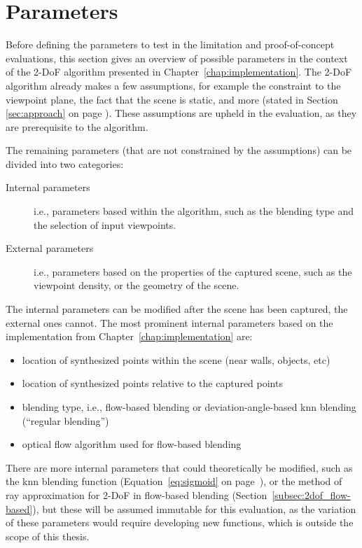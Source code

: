 \section{Parameters} \label{sec:params}
Before defining the parameters to test in the limitation and proof-of-concept evaluations, this section gives an overview of possible parameters in the context of the 2-DoF algorithm presented in Chapter~\ref{chap:implementation}.
The 2-DoF algorithm already makes a few assumptions, for example the constraint to the viewpoint plane, the fact that the scene is static, and more (stated in Section \ref{sec:approach} on page \pageref{sec:approach}). These assumptions are upheld in the evaluation, as they are prerequisite to the algorithm.

The remaining parameters (that are not constrained by the assumptions) can be divided into two categories: 
\begin{description}
    \item [Internal parameters] i.e., parameters based within the algorithm, such as the blending type and the selection of input viewpoints.
    \item [External parameters] i.e., parameters based on the properties of the captured scene, such as the viewpoint density, or the geometry of the scene.
\end{description}      

The internal parameters can be modified after the scene has been captured, the external ones cannot.  The most prominent internal parameters based on the implementation from Chapter~\ref{chap:implementation} are:

\begin{itemize}
  \item location of synthesized points within the scene (near walls, objects, etc)
  \item location of synthesized points relative to the captured points
  \item blending type, i.e., flow-based blending or deviation-angle-based knn blending (``regular blending'')
  \item optical flow algorithm used for flow-based blending
\end{itemize}

There are more internal parameters that could theoretically be modified, such as the knn blending function (Equation~\ref{eq:sigmoid} on page~\pageref{eq:sigmoid}), or the method of ray approximation for 2-DoF in flow-based blending (Section~\ref{subsec:2dof_flow-based}), but these will be assumed immutable for this evaluation, as the variation of these parameters would require developing new functions, which is outside the scope of this thesis.

